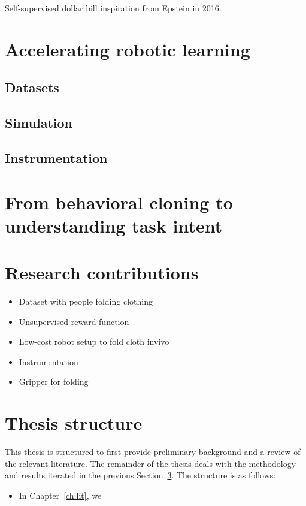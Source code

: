 \documentclass[\home/main.tex]{subfiles}
\begin{document}
Self-supervised dollar bill inspiration from Epstein in 2016.



\section{Accelerating robotic learning}
\subsection{Datasets}
\subsection{Simulation}
\subsection{Instrumentation}
\section{From behavioral cloning to understanding task intent}
\section{Research contributions} \label{sec:intro_contributions}
\begin{itemize}
    \item Dataset with people folding clothing
    \item Unsupervised reward function
    \item Low-cost robot setup to fold cloth invivo
    \item Instrumentation
    \item Gripper for folding
\end{itemize}

\section{Thesis structure}
This thesis is structured to first provide preliminary background and a review of the relevant literature. The remainder of the thesis deals with the methodology and results iterated in the previous Section~\ref{sec:intro_contributions}. The structure is as follows:
\begin{itemize}
    \item In Chapter~\ref{ch:lit}, we
\end{itemize}
\end{document}
